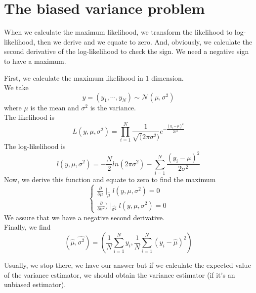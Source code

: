 \documentclass{article}
\begin{document}
\section{The biased variance problem}
When we calculate the maximum likelihood, we transform the likelihood to log-likelihood, then we derive and we equate to zero. And, obviously, we calculate the second derivative of the log-likelihood to check the sign. We need a negative sign to have a maximum.\\
\begin{example}
First, we calculate the maximum likelihood in $1$ dimension.\\
We take
\[ y = (y_1, \cdots, y_N) \sim \mathcal{N}(\mu, \sigma^2) \]
where $\mu$ is the mean and $\sigma^2$ is the variance.\\
The likelihood is \[ L(y, \mu, \sigma^2) = \prod_{i=1}^N \frac{1}{\sqrt(2\pi \sigma^2)}e^{-\frac{(y_i-\mu)^2}{2\sigma^2}} \]
The log-likelihood is \[l(y, \mu, \sigma^2) = -\frac{N}{2}ln(2\pi\sigma^2)-\sum_{i=1}^N\frac{(y_i-\mu)^2}{2\sigma^2}\]
Now, we derive this function and equate to zero to find the maximum
\begin{equation*}
    \begin{cases}
        \frac{\partial}{\partial \mu}\mid_{\hat{\mu}}l(y, \mu, \sigma^2) = 0 \\
        \frac{\partial}{\partial \sigma^2})\mid_{\widehat{\sigma^2}}l(y, \mu, \sigma^2) = 0
    \end{cases}
\end{equation*}
We assure that we have a negative second derivative.\\
Finally, we find \[ (\hat{\mu}, \widehat{\sigma^2}) = (\frac{1}{N} \sum_{i=1}^N y_i, \frac{1}{N} \sum_{i=1}^N(y_i-\hat{\mu})^2)\]
\end{example}
Usually, we stop there, we have our answer but if we calculate the expected value of the variance estimator, we should obtain the variance estimator (if it's an unbiased estimator).\\
\end{document}
